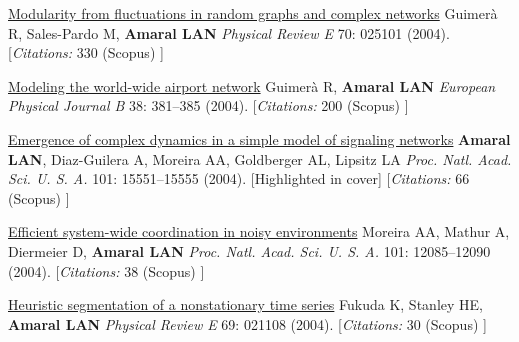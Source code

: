 \NumberedItem{\makebox[0.8cm][r]{[57]}}
\href{/people/amaral/modularity-from-fluctuations-in-random-graphs-and-complex-networks}
{Modularity from fluctuations in random graphs and complex networks}
\newline
Guimer\`a R, Sales-Pardo M, {\textbf{Amaral LAN}}
\newline
\textit{Physical Review E}
    70:
025101 (2004).
    [{\em{Citations:}}  330 (Scopus) ]
\newline
\Gap
~
\Gap

\NumberedItem{\makebox[0.8cm][r]{[56]}}
\href{/people/amaral/modeling-the-world-wide-airport-network}
{Modeling the world-wide airport network}
\newline
Guimer\`a R, {\textbf{Amaral LAN}}
\newline
\textit{European Physical Journal B}
    38:
381--385 (2004).
    [{\em{Citations:}}  200 (Scopus) ]
\newline
\Gap
~
\Gap

\NumberedItem{\makebox[0.8cm][r]{[55]}}
\href{/people/amaral/emergence-of-complex-dynamics-in-a-simple-model-of-signaling-networks}
{Emergence of complex dynamics in a simple model of signaling networks}
\newline
{\textbf{Amaral LAN}}, Diaz-Guilera A, Moreira AA, Goldberger AL, Lipsitz LA
\newline
\textit{Proc. Natl. Acad. Sci. U. S. A.}
    101:
15551--15555 (2004).
    [Highlighted in cover]
    [{\em{Citations:}}  66 (Scopus) ]
\newline
\Gap
~
\Gap

\NumberedItem{\makebox[0.8cm][r]{[54]}}
\href{/people/amaral/efficient-system-wide-coordination-in-noisy-environments}
{Efficient system-wide coordination in noisy environments}
\newline
Moreira AA, Mathur A, Diermeier D, {\textbf{Amaral LAN}}
\newline
\textit{Proc. Natl. Acad. Sci. U. S. A.}
    101:
12085--12090 (2004).
    [{\em{Citations:}}  38 (Scopus) ]
\newline
\Gap
~
\Gap

\NumberedItem{\makebox[0.8cm][r]{[53]}}
\href{/people/amaral/heuristic-segmentation-of-a-nonstationary-time-series}
{Heuristic segmentation of a nonstationary time series}
\newline
Fukuda K, Stanley HE, {\textbf{Amaral LAN}}
\newline
\textit{Physical Review E}
    69:
021108 (2004).
    [{\em{Citations:}}  30 (Scopus) ]
\newline
\Gap
~
\Gap

